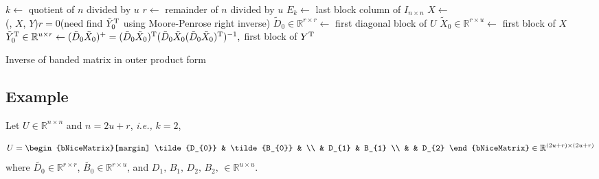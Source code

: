 \IncMargin{1em}
\begin{algorithm}
    \BlankLine
    $k \leftarrow$ quotient of $n$ divided by $u$ 
    $r \leftarrow$ remainder of $n$ divided by $u$ 
    $E_{k} \leftarrow$ last block column of $I_{n \times n}$ 
    $X \leftarrow$ \\
    \eIf(, $X$, $Y$){$r=0$}{}(need find $\tilde{Y}_{0}^{\mathrm{T}}$ using Moore-Penrose right inverse){
        $\tilde{D}_{0} \in \mathbb{R}^{r \times r} \leftarrow$ first diagonal block of $U$
        $\tilde{X}_{0}\in \mathbb{R}^{r \times u} \leftarrow$ first block of $X$
        $\tilde{Y}_{0}^{\mathrm{T}}\in \mathbb{R}^{u \times r} \leftarrow (\tilde{D}_{0} \tilde{X}_{0})^{+} = (\tilde{D}_{0} \tilde{X}_{0})^{\mathrm{T}} (\tilde{D}_{0} \tilde{X}_{0} (\tilde{D}_{0} \tilde{X}_{0})^{\mathrm{T}})^{-1},$ first block of $Y^{\mathrm{T}}$
    }
    \caption{Inverse of banded matrix in outer product form}\label{Uinv_out_XY}
\end{algorithm}\DecMargin{1em}


\subsection{Example}

Let $U \in \mathbb{R}^{n \times n}$ and $n = 2u+r$, \textit{i.e.,} $k=2$,

\begin{align*}
    U = 
    \begin{bNiceMatrix}[margin]
        \tilde{D_{0}}   & \tilde{B_{0}} &       \\
                & D_{1} & B_{1} \\
                &       & D_{2} 
    \end{bNiceMatrix}\in \mathbb{R}^{(2u+r) \times (2u+r)}
\end{align*}
\noindent where $\tilde{D_{0}} \in \mathbb{R}^{r \times r}$, $\tilde{B_{0}} \in \mathbb{R}^{r \times u}$, 
and $D_{1},\,B_{1},\,D_{2},\,B_{2},\, \in \mathbb{R}^{u \times u}$.


